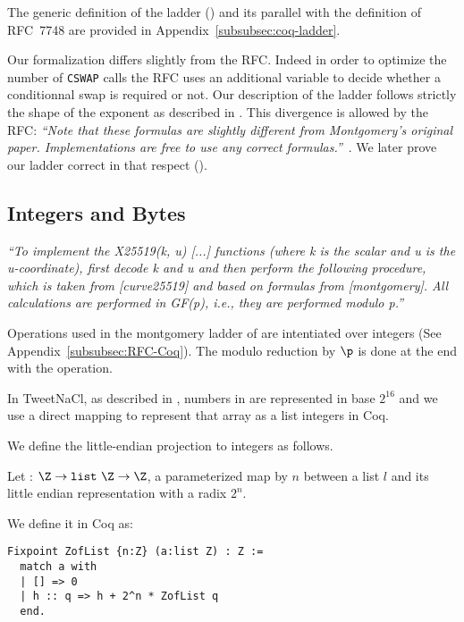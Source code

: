 The generic definition of the ladder () and its parallel with
the definition of RFC~7748 are provided in Appendix~\ref{subsubsec:coq-ladder}.

Our formalization differs slightly from the RFC. Indeed in order to optimize the
number of \texttt{CSWAP} calls the RFC uses an additional variable to decide
whether a conditionnal swap is required or not. Our description of the ladder
follows strictly the shape of the exponent as described in .
This divergence is allowed by the RFC:
\emph{``Note that these formulas are slightly different from Montgomery's
original paper.  Implementations are free to use any correct formulas.''}~\cite{rfc7748}.
We later prove our ladder correct in that respect ().




\subsection{Integers and Bytes}
\label{subsec:integer-bytes}

\emph{``To implement the X25519(k, u) [...] functions (where k is
the scalar and u is the u-coordinate), first decode k and u and then
perform the following procedure, which is taken from [curve25519] and
based on formulas from [montgomery].  All calculations are performed
in GF(p), i.e., they are performed modulo p.''}~\cite{rfc7748}

Operations used in the montgomery ladder of  are intentiated over
integers (See Appendix~\ref{subsubsec:RFC-Coq}). The modulo reduction by $\p$
is done  at the end with the  operation.

In TweetNaCl, as described in , numbers in  are
represented in base $2^{16}$ and we use a direct mapping to represent that array as a list
integers in Coq.

We define the little-endian projection to integers as follows.
\begin{dfn}
Let  : $\Z \rightarrow \texttt{list}~\Z \rightarrow \Z$,
a parameterized map by $n$ between a list $l$ and its little endian representation
with a radix $2^n$.
\end{dfn}
We define it in Coq as:
\begin{lstlisting}[language=Coq]
Fixpoint ZofList {n:Z} (a:list Z) : Z :=
  match a with
  | [] => 0
  | h :: q => h + 2^n * ZofList q
  end.
\end{lstlisting}

